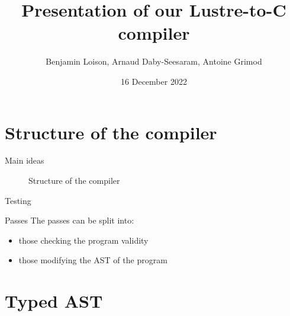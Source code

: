 \documentclass{beamer}
\begin{document}
\title{Presentation of our Lustre-to-C compiler}
\date{16 December 2022}
\author{Benjamin Loison, Arnaud Daby-Seesaram, Antoine Grimod}

\frame{\titlepage}

\section{Structure of the compiler}
\begin{frame}{Main ideas}
	\begin{figure}
		\caption{Structure of the compiler}
	\end{figure}
\end{frame}

\begin{frame}{Testing}
	\begin{block}{Passes}
		The passes can be split into:
		\begin{itemize}
			\item those checking the program validity
			\item those modifying the AST of the program
		\end{itemize}
	\end{block}
\end{frame}

\section{Typed AST}
\end{document}
